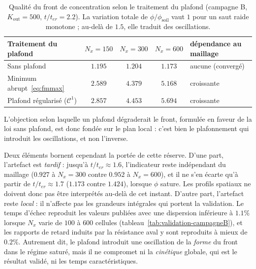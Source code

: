 \documentclass[11pt,a4paper]{report}
\newcommand{\phisol}{\phi_{\mathrm{soil}}}
\newcommand{\kout}{K_{\mathrm{out}}}
\newcommand{\ter}{{t_{er}}}
\begin{document}
\begin{table}[H]
\centering
\caption{Qualité du front de concentration selon le traitement du plafond (campagne B, \(\kout = 500\),
\(t/\ter = 2.2\)). La variation totale de \(\phi/\phisol\) vaut \(1\) pour un saut raide monotone ;
au-delà de \(1.5\), elle traduit des oscillations.}
\label{tab:front-cap}
\small
\begin{tabular}{lcccl}
\toprule
Traitement du plafond & \(N_x = 150\) & \(N_x = 300\) & \(N_x = 600\) & dépendance au maillage \\
\midrule
Sans plafond & \(1.195\) & \(1.204\) & \(1.173\) & aucune (convergé) \\
Minimum abrupt~\eqref{eq:fmmax} & \(2.589\) & \(4.379\) & \(5.168\) & croissante \\
Plafond régularisé (\(\mathcal{C}^1\)) & \(2.857\) & \(4.453\) & \(5.694\) & croissante \\
\bottomrule
\end{tabular}
\begin{tablenotes}
\small
\item L'objection selon laquelle un plafond dégraderait le front, formulée en faveur de la loi sans
plafond, est donc fondée sur le plan local : c'est bien le plafonnement qui introduit les oscillations, et
non l'inverse.
\end{tablenotes}
\end{table}

Deux éléments bornent cependant la portée de cette réserve. D'une part, l'artefact est \emph{tardif} :
jusqu'à \(t/\ter \approx 1.6\), l'indicateur reste indépendant du maillage (\(0.927\) à \(N_x = 300\)
contre \(0.952\) à \(N_x = 600\)), et il ne s'en écarte qu'à partir de \(t/\ter \approx 1.7\)
(\(1.173\) contre \(1.424\)), lorsque \(\phi\) sature. Les profils spatiaux ne doivent donc pas être
interprétés au-delà de cet instant. D'autre part, l'artefact reste \emph{local} : il n'affecte pas les
grandeurs intégrales qui portent la validation. Le temps d'échec reproduit les valeurs publiées avec une
dispersion inférieure à \(1.1\%\) lorsque \(N_x\) varie de \(100\) à \(600\) cellules
(tableau~\ref{tab:validation-campagneB}), et les rapports de retard induits par la résistance aval y sont
reproduits à mieux de \(0.2\%\). Autrement dit, le plafond introduit une oscillation de la \emph{forme} du
front dans le régime saturé, mais il ne compromet ni la \emph{cinétique} globale, qui est le résultat
validé, ni les temps caractéristiques.
\end{document}
